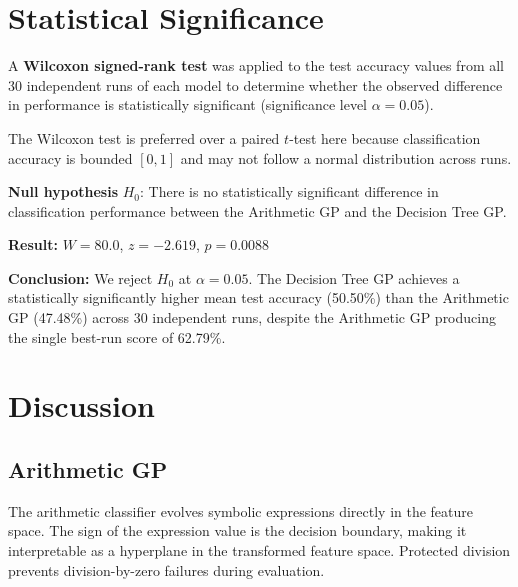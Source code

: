 \documentclass[12pt,a4paper]{article}
\begin{document}
\section{Statistical Significance}

A \textbf{Wilcoxon signed-rank test} was applied to the test accuracy values from all 30 independent runs of each model to determine whether the observed difference in performance is statistically significant (significance level $\alpha = 0.05$).

The Wilcoxon test is preferred over a paired $t$-test here because classification accuracy is bounded $[0, 1]$ and may not follow a normal distribution across runs.

\vspace{1em}
\noindent\textbf{Null hypothesis} $H_0$: There is no statistically significant difference in classification performance between the Arithmetic GP and the Decision Tree GP.

\vspace{0.5em}
\noindent\textbf{Result:} $W = 80.0$, $z = -2.619$, $p = 0.0088$

\vspace{0.5em}
\noindent\textbf{Conclusion:} We reject $H_0$ at $\alpha = 0.05$. The Decision Tree GP achieves a statistically significantly higher mean test accuracy (50.50\%) than the Arithmetic GP (47.48\%) across 30 independent runs, despite the Arithmetic GP producing the single best-run score of 62.79\%.

\section{Discussion}

\subsection{Arithmetic GP}

The arithmetic classifier evolves symbolic expressions directly in the feature space. The sign of the expression value is the decision boundary, making it interpretable as a hyperplane in the transformed feature space. Protected division prevents division-by-zero failures during evaluation.
\end{document}
